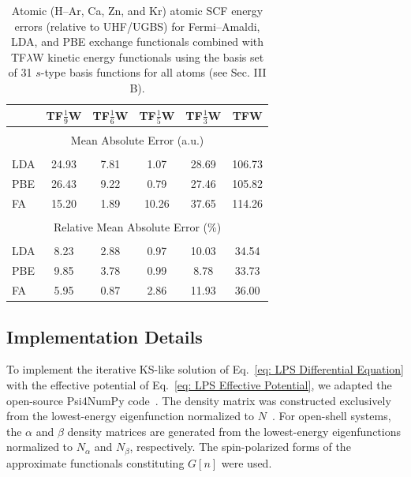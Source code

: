 \documentclass[%
 reprint,
 amsmath,amssymb,
 aps,
pra,
]{revtex4-2}
\begin{document}
\begin{table}[t]
\caption{Atomic (H--Ar, Ca, Zn, and Kr) atomic SCF energy errors (relative to UHF/UGBS) for Fermi--Amaldi, LDA, and PBE exchange functionals combined with TF$\lambda$W kinetic energy functionals using the basis set of 31 $s$-type basis functions for all atoms (see Sec. III B).}
\begin{ruledtabular}
\begin{tabular*}{\textwidth}{lccccc}
 & TF$\frac{1}{9}$W & TF$\frac{1}{6}$W & TF$\frac{1}{5}$W & TF$\frac{1}{3}$W & TFW\\ [3pt]
\hline\\[-7pt]
\multicolumn{6}{c}{Mean Absolute Error (a.u.)}\\[2pt]
\hline\\[-7pt]
LDA & 24.93 & 7.81 & 1.07 & 28.69 & 106.73\\[3pt]
PBE & 26.43 & 9.22 & 0.79 & 27.46 & 105.82\\[3pt]
FA  & 15.20 & 1.89 & 10.26 & 37.65 & 114.26\\[3pt]
\hline\\[-7pt]
\multicolumn{6}{c}{Relative Mean Absolute Error (\%)}\\[2pt]
\hline\\[-7pt]
LDA & 8.23 & 2.88 & 0.97 & 10.03 & 34.54\\[3pt]
PBE & 9.85 & 3.78 & 0.99 & 8.78 & 33.73\\[3pt]
FA  & 5.95 & 0.87 & 2.86 & 11.93 & 36.00\\
\end{tabular*}
\end{ruledtabular}
\end{table}

\subsection{Implementation Details}

To implement the iterative KS-like solution of Eq.~\eqref{eq: LPS Differential Equation} with the effective potential of Eq.~\eqref{eq: LPS Effective Potential}, we adapted the open-source Psi4NumPy code~\cite{Smith.2018.JCTC.14.3504, Smith.2020.JCP.152.184108}. The density matrix was constructed exclusively from the lowest-energy eigenfunction normalized to $N$~\cite{Levy.1984.PRA.30.2745}. For open-shell systems, the $\alpha$ and $\beta$ density matrices are generated from the lowest-energy eigenfunctions normalized to $N_{\alpha}$ and $N_{\beta}$, respectively. The spin-polarized forms of the approximate functionals constituting $G[n]$ were used. 
\end{document}
